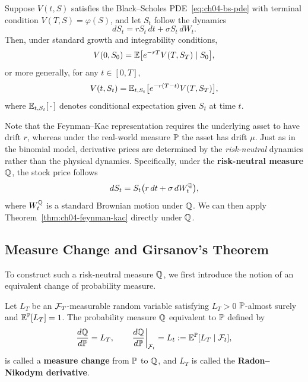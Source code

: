 \begin{theorem}
    \label{thm:ch04-feynman-kac}
    Suppose $V(t, S)$ satisfies the Black--Scholes PDE~\eqref{eq:ch04-bs-pde} with terminal condition $V(T, S) = \varphi(S)$, and let $S_t$ follow the dynamics
    \[
        dS_t = r S_t\,dt + \sigma S_t\,dW_t.
    \]
    Then, under standard growth and integrability conditions,
    \[
        V(0, S_0) = \mathbb{E}\bigl[e^{-rT} V(T, S_T) \mid S_0\bigr],
    \]
    or more generally, for any $t \in [0, T]$,
    \[
        V(t, S_t) = \mathbb{E}_{t, S_t}\bigl[e^{-r(T-t)} V(T, S_T)\bigr],
    \]
    where $\mathbb{E}_{t, S_t}[\,\cdot\,]$ denotes conditional expectation given $S_t$ at time $t$.
\end{theorem}

Note that the Feynman--Kac representation requires the underlying asset to have drift $r$, whereas under the real-world measure $\mathbb{P}$ the asset has drift $\mu$. Just as in the binomial model, derivative prices are determined by the \emph{risk-neutral} dynamics rather than the physical dynamics. Specifically, under the \textbf{risk-neutral measure} $\mathbb{Q}$, the stock price follows
\[
    dS_t = S_t\bigl(r\,dt + \sigma\,dW_t^{\mathbb{Q}}\bigr),
\]
where $W_t^{\mathbb{Q}}$ is a standard Brownian motion under $\mathbb{Q}$. We can then apply Theorem~\ref{thm:ch04-feynman-kac} directly under $\mathbb{Q}$.

\subsection{Measure Change and Girsanov's Theorem}
To construct such a risk-neutral measure $\mathbb{Q}$, we first introduce the notion of an equivalent change of probability measure.

\begin{definition}
    \label{def:ch04-measure-change}
    Let $L_T$ be an $\mathcal{F}_T$-measurable random variable satisfying $L_T > 0$ $\mathbb{P}$-almost surely and $\mathbb{E}^{\mathbb{P}}[L_T] = 1$. The probability measure $\mathbb{Q}$ equivalent to $\mathbb{P}$ defined by
    \[
        \frac{d\mathbb{Q}}{d\mathbb{P}} = L_T, \qquad \left.\frac{d\mathbb{Q}}{d\mathbb{P}}\right|_{\mathcal{F}_t} = L_t := \mathbb{E}^{\mathbb{P}}[L_T \mid \mathcal{F}_t],
    \]
    is called a \textbf{measure change} from $\mathbb{P}$ to $\mathbb{Q}$, and $L_T$ is called the \textbf{Radon--Nikodym derivative}.
\end{definition}

